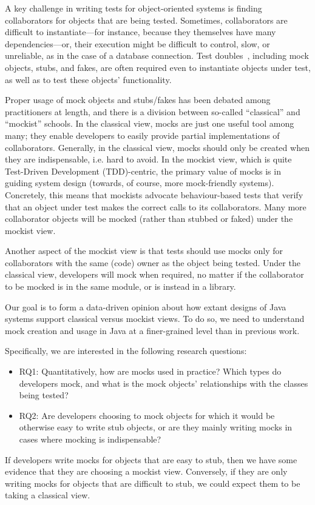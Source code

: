 A key challenge in writing tests for object-oriented systems is
finding collaborators for objects that are being tested. Sometimes,
collaborators are difficult to instantiate---for instance, because
they themselves have many dependencies---or, their execution might be
difficult to control, slow, or unreliable, as in the case of a
database connection.  Test doubles~\cite{meszaros2007xunit}, including
mock objects, stubs, and fakes, are often required even to instantiate
objects under test, as well as to test these objects' functionality.

Proper usage of mock objects and stubs/fakes has been debated among
practitioners at length, and there is a division between so-called
``classical'' and ``mockist'' schools. In the classical view, mocks
are just one useful tool among many; they enable developers to easily
provide partial implementations of collaborators. Generally, in the classical
view, mocks should only be created when they are indispensable, i.e. hard to avoid. In the mockist view,
which is quite Test-Driven Development (TDD)-centric, the primary value
of mocks is in guiding system design (towards, of course, more mock-friendly
systems). Concretely, this means that mockists advocate behaviour-based
tests that verify that an object under test makes the correct calls
to its collaborators. Many more collaborator objects will be mocked
(rather than stubbed or faked) under the mockist view.

Another aspect of the mockist view is that tests should use mocks
only for collaborators with the same (code) owner as the object
being tested. Under the classical view, developers will mock
when required, no matter if the collaborator to be mocked is in
the same module, or is instead in a library.


Our goal is to form a data-driven opinion about how extant designs of
Java systems support classical versus mockist views.  To do so, we
need to understand mock creation and usage in Java at a finer-grained level than in
previous work.

Specifically, we are interested in the following research questions:
\begin{itemize}
\item RQ1: Quantitatively, how are mocks used in practice? Which types do developers mock, and what is the
mock objects' relationships with the classes being tested?
\item RQ2: Are developers choosing to mock objects for which it would be otherwise easy to write stub objects, or
are they mainly writing mocks in cases where mocking is indispensable?
\end{itemize}
If developers write mocks for objects that are easy to stub, then we have some evidence that they are choosing
a mockist view. Conversely, if they are only writing mocks for objects that are difficult to stub, we could
expect them to be taking a classical view.

